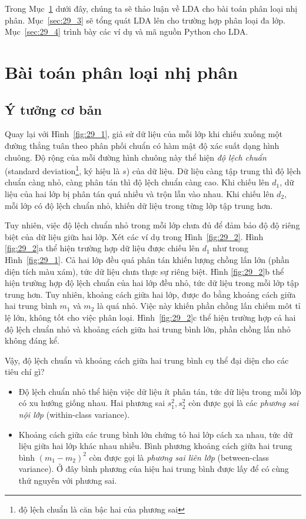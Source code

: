 Trong Mục~\ref{sec:29_2} dưới đây, chúng ta sẽ thảo luận về LDA cho bài toán
phân loại nhị phân. Mục~\ref{sec:29_3} sẽ tổng quát LDA lên cho trường hợp phân
loại đa lớp. Mục~\ref{sec:29_4} trình bày các ví dụ và mã nguồn Python cho LDA.
 
 
\section{Bài toán phân loại nhị phân}
\label{sec:29_2}
\subsection{Ý tưởng cơ bản}
Quay lại với Hình~\ref{fig:29_1}, giả sử dữ liệu của mỗi lớp khi chiếu
xuống một đường thẳng tuân theo phân phối chuẩn có hàm mật độ xác suất dạng hình chuông. Độ rộng của mỗi đường hình chuông này thể hiện \textit{độ lệch
chuẩn} ({standard deviation}\footnote{độ lệch chuẩn là căn bậc hai của
phương sai}, ký hiệu là $s$) của dữ liệu. Dữ liệu càng tập trung thì độ lệch
chuẩn càng nhỏ,
càng phân tán thì độ lệch chuẩn càng cao. Khi chiếu lên $d_1$, dữ liệu của
hai lớp bị phân tán quá nhiều và trộn lẫn vào nhau. Khi chiếu lên $d_2$, mỗi lớp
có độ lệch chuẩn nhỏ, khiến dữ liệu trong từng
lớp tập trung hơn. 
 

Tuy nhiên, việc độ lệch chuẩn nhỏ trong mỗi lớp chưa đủ để đảm bảo độ độ riêng
biệt của dữ liệu giữa hai lớp. Xét các ví dụ trong
Hình~\ref{fig:29_2}. Hình \ref{fig:29_2}a thể hiện trường hợp 
dữ liệu được chiếu lên $d_1$ như trong Hình~\ref{fig:29_1}. Cả hai lớp đều quá
phân 
tán khiến lượng chồng lấn lớn (phần diện tích màu xám), tức dữ liệu chưa
thực sự riêng biệt. Hình \ref{fig:29_2}b thể hiện trường hợp độ lệch
chuẩn của hai lớp đều nhỏ, tức dữ liệu trong mỗi lớp tập trung hơn. Tuy nhiên, khoảng cách giữa hai lớp, được đo bằng khoảng cách
giữa hai trung bình $m_1$ và $m_2$ là quá nhỏ. Việc này khiến phần chồng lấn chiếm
môt tỉ lệ lớn, không tốt cho việc phân loại.
Hình~\ref{fig:29_2}c thể hiện trường hợp cả hai độ lệch chuẩn nhỏ và khoảng
cách giữa hai trung bình lớn, phần chồng lấn nhỏ không đáng kể.
 
Vậy, độ lệch chuẩn và khoảng cách giữa hai trung bình cụ thể đại diện cho các tiêu
chí gì? 
\begin{itemize}
    \item Độ lệch chuẩn nhỏ thể hiện việc dữ liệu ít phân tán, tức dữ liệu
    trong mỗi lớp có xu hướng giống nhau. Hai phương sai $s_1^2, s_2^2$ còn được
    gọi là các \textit{phương sai nội lớp} ({within-class variance}).
     
    \item Khoảng cách giữa các trung bình lớn chứng tỏ hai lớp cách xa
    nhau, tức dữ liệu giữa hai lớp khác nhau nhiều. Bình phương khoảng cách
    giữa hai trung bình $(m_1 - m_2)^2$ còn được gọi là \textit{phương sai liên lớp} ({between-class variance}). Ở đây bình phương của hiệu hai trung bình được lấy để có cùng thứ nguyên với phương sai.
\end{itemize}
 
